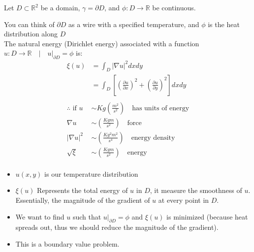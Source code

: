 \begin{proposition}
    Let $D \subset \mathbb{R}^2$ be a domain, $\gamma = \partial D$, and $\phi : D \rightarrow \mathbb{R}$ be continuous.

    You can think of $\partial D$ as a wire with a specified temperature, and $\phi$ is the heat distribution along $D$\\
    The natural energy (Dirichlet energy) associated with a function $u: D \rightarrow \mathbb{R} \quad | \quad u|_{\partial D} = \phi$ is:
    \begin{align*}
        \xi(u)                   & = \int_D |\nabla u|^2 dxdy                                                                                                   \\
                                 & = \int_D \left[ \left( \frac{\partial u}{\partial x} \right)^2 + \left( \frac{\partial u}{\partial y} \right)^2 \right] dxdy \\\\
        \therefore \text{ if } u & \sim Kg (\frac{m^2}{s^2}) \quad \text{has units of energy}                                                                   \\
        \nabla u                 & \sim (\frac{Kgm}{s^2}) \quad \text{force}                                                                                    \\
        |\nabla u|^2             & \sim (\frac{Kg^2m^2}{s^4}) \quad \text{energy density}                                                                       \\
        \sqrt{\xi}               & \sim (\frac{Kg m}{s^2}) \quad \text{energy}                                                                                  \\
    \end{align*}
    \begin{itemize}
        \item $u(x, y)$ is our temperature distribution
        \item $\xi(u)$ Represents the total energy of $u$ in $D$, it measure the smoothness of $u$. Essentially, the magnitude of the gradient of $u$ at every point in $D$.
        \item We want to find $u$ such that $u|_{\partial D} = \phi$ and $\xi(u)$ is minimized (because heat spreads out, thus we should reduce the magnitude of the gradient).
        \item This is a boundary value problem.
    \end{itemize}

\end{proposition}
